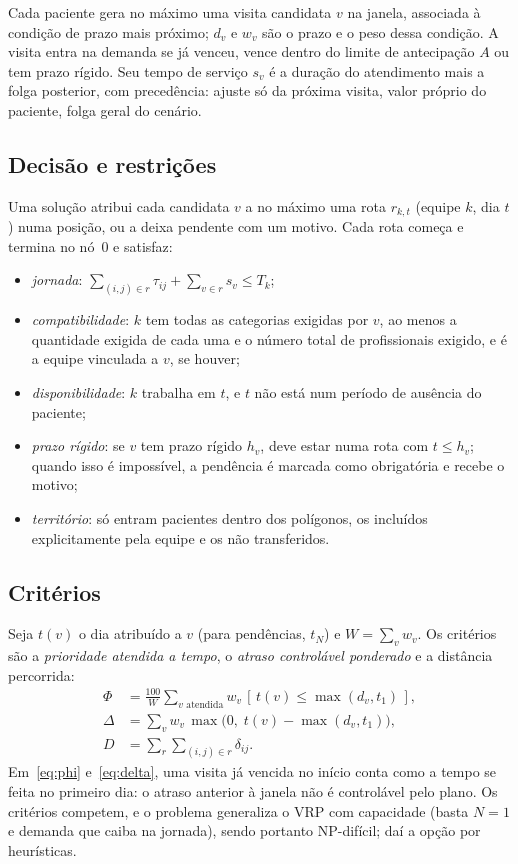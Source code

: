 \documentclass[conference,a4paper]{IEEEtran}
\begin{document}
Cada paciente gera no máximo uma visita candidata $v$ na janela, associada à condição de prazo mais próximo; $d_v$ e $w_v$ são o prazo e o peso dessa condição. A visita entra na demanda se já venceu, vence dentro do limite de antecipação $A$ ou tem prazo rígido. Seu tempo de serviço $s_v$ é a duração do atendimento mais a folga posterior, com precedência: ajuste só da próxima visita, valor próprio do paciente, folga geral do cenário.

\subsection{Decisão e restrições}

Uma solução atribui cada candidata $v$ a no máximo uma rota $r_{k,t}$ (equipe $k$, dia $t$) numa posição, ou a deixa pendente com um motivo. Cada rota começa e termina no nó~0 e satisfaz:
\begin{itemize}
  \item \emph{jornada}: $\sum_{(i,j)\in r} \tau_{ij} + \sum_{v\in r} s_v \le T_k$;
  \item \emph{compatibilidade}: $k$ tem todas as categorias exigidas por $v$, ao menos a quantidade exigida de cada uma e o número total de profissionais exigido, e é a equipe vinculada a $v$, se houver;
  \item \emph{disponibilidade}: $k$ trabalha em $t$, e $t$ não está num período de ausência do paciente;
  \item \emph{prazo rígido}: se $v$ tem prazo rígido $h_v$, deve estar numa rota com $t \le h_v$; quando isso é impossível, a pendência é marcada como obrigatória e recebe o motivo;
  \item \emph{território}: só entram pacientes dentro dos polígonos, os incluídos explicitamente pela equipe e os não transferidos.
\end{itemize}

\subsection{Critérios}

Seja $t(v)$ o dia atribuído a $v$ (para pendências, $t_N$) e $W = \sum_v w_v$. Os critérios são a \emph{prioridade atendida a tempo}, o \emph{atraso controlável ponderado} e a distância percorrida:
\begin{align}
  \Phi &= \frac{100}{W} \sum_{v \text{ atendida}} w_v \, [\, t(v) \le \max(d_v, t_1) \,], \label{eq:phi}\\
  \Delta &= \sum_{v} w_v \, \max\bigl(0,\; t(v) - \max(d_v, t_1)\bigr), \label{eq:delta}\\
  D &= \textstyle\sum_{r}\sum_{(i,j)\in r} \delta_{ij}. \label{eq:dist}
\end{align}
Em~\eqref{eq:phi} e~\eqref{eq:delta}, uma visita já vencida no início conta como a tempo se feita no primeiro dia: o atraso anterior à janela não é controlável pelo plano. Os critérios competem, e o problema generaliza o VRP com capacidade (basta $N=1$ e demanda que caiba na jornada), sendo portanto NP-difícil; daí a opção por heurísticas.
\end{document}
